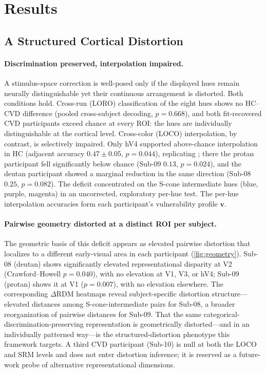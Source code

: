 \documentclass{article}
\begin{document}
\section{Results}
\label{sec:results}

\subsection{A Structured Cortical Distortion}
\label{sec:results_distortion}

\paragraph{Discrimination preserved, interpolation impaired.}
A stimulus-space correction is well-posed only if the displayed hues remain neurally distinguishable yet their continuous arrangement is distorted.
Both conditions hold.
Cross-run (LORO) classification of the eight hues shows no HC--CVD difference (pooled cross-subject decoding, $p = 0.668$), and both fit-recovered CVD participants exceed chance at every ROI: the hues are individually distinguishable at the cortical level.
Cross-color (LOCO) interpolation, by contrast, is selectively impaired.
Only hV4 supported above-chance interpolation in HC (adjacent accuracy $0.47 \pm 0.05$, $p = 0.044$), replicating \citet{brouwer2009}; there the protan participant fell significantly below chance (Sub-09 $0.13$, $p = 0.024$), and the deutan participant showed a marginal reduction in the same direction (Sub-08 $0.25$, $p = 0.082$). The deficit concentrated on the S-cone intermediate hues (blue, purple, magenta) in an uncorrected, exploratory per-hue test.
The per-hue interpolation accuracies form each participant's vulnerability profile $\mathbf{v}$.

\paragraph{Pairwise geometry distorted at a distinct ROI per subject.}
The geometric basis of this deficit appears as elevated pairwise distortion that localizes to a different early-visual area in each participant (\cref{fig:geometry}).
Sub-08 (deutan) shows significantly elevated representational disparity at V2 (Crawford--Howell $p = 0.040$), with no elevation at V1, V3, or hV4; Sub-09 (protan) shows it at V1 ($p = 0.007$), with no elevation elsewhere.
The corresponding $\Delta$RDM heatmaps reveal subject-specific distortion structure---elevated distances among S-cone-intermediate pairs for Sub-08, a broader reorganization of pairwise distances for Sub-09.
That the same categorical-discrimination-preserving representation is geometrically distorted---and in an individually patterned way---is the structured-distortion phenotype this framework targets.
A third CVD participant (Sub-10) is null at both the LOCO and SRM levels and does not enter distortion inference; it is reserved as a future-work probe of alternative representational dimensions.
\end{document}

